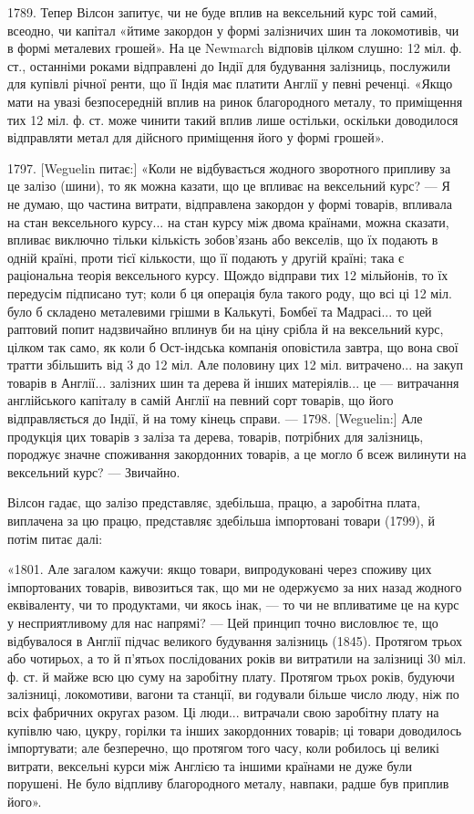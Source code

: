 1789. Тепер Вілсон запитує, чи не буде вплив на вексельний курс той
самий, всеодно, чи капітал «йтиме закордон у формі залізничих шин та локомотивів,
чи в формі металевих грошей». На це Newmarch відповів цілком слушно:
12 міл. ф. ст., останніми роками відправлені до Індії для будування залізниць,
послужили для купівлі річної ренти, що її Індія має платити Англії у певні
реченці. «Якщо мати на увазі безпосередній вплив на ринок благородного металу,
то приміщення тих 12 міл. ф. ст. може чинити такий вплив лише остільки,
оскільки доводилося відправляти метал для дійсного приміщення його у формі
грошей».

1797. [Weguelin питає:] «Коли не відбувається жодного зворотного припливу
за це залізо (шини), то як можна казати, що це впливає на вексельний курс? —
Я не думаю, що частина витрати, відправлена закордон у формі товарів, впливала
на стан вексельного курсу... на стан курсу між двома країнами, можна
сказати, впливає виключно тільки кількість зобов’язань або векселів, що їх
подають в одній країні, проти тієї кількости, що її подають у другій країні; така
є раціональна теорія вексельного курсу. Щождо відправи тих 12 мільйонів, то
їх передусім підписано тут; коли б ця операція була такого роду, що всі ці
12 міл. було б складено металевими грішми в Калькуті, Бомбеї та Мадрасі...
то цей раптовий попит надзвичайно вплинув би на ціну срібла й на вексельний
курс, цілком так само, як коли б Ост-індська компанія оповістила завтра, що
вона свої тратти збільшить від 3 до 12 міл. Але половину цих 12 міл. витрачено...
на закуп товарів в Англії... залізних шин та дерева й інших матеріялів...
це — витрачання англійського капіталу в самій Англії на певний сорт
товарів, що його відправляється до Індії, й на тому кінець справи. — 1798.
[Weguelin:] Але продукція цих товарів з заліза та дерева, товарів, потрібних для
залізниць, породжує значне споживання закордонних товарів, а це могло б всеж
вилинути на вексельний курс? — Звичайно.

Вілсон гадає, що залізо представляє, здебільша, працю, а заробітна плата,
виплачена за цю працю, представляє здебільша імпортовані товари (1799), й
потім питає далі:

«1801. Але загалом кажучи: якщо товари, випродуковані через споживу
цих імпортованих товарів, вивозиться так, що ми не одержуємо за них назад
жодного еквіваленту, чи то продуктами, чи якось інак, — то чи не впливатиме
це на курс у несприятливому для нас напрямі? — Цей принцип точно висловлює те,
що відбувалося в Англії підчас великого будування залізниць (1845). Протягом
трьох або чотирьох, а то й п’ятьох послідованих років ви витратили на залізниці
30 міл. ф. ст. й майже всю цю суму на заробітну плату. Протягом трьох років,
будуючи залізниці, локомотиви, вагони та станції, ви годували більше число
люду, ніж по всіх фабричних округах разом. Ці люди... витрачали свою заробітну
плату на купівлю чаю, цукру, горілки та інших закордонних товарів; ці
товари доводилось імпортувати; але безперечно, що протягом того часу, коли робилось
ці великі витрати, вексельні курси між Англією та іншими країнами не
дуже були порушені. Не було відпливу благородного металу, навпаки, радше був
приплив його».

